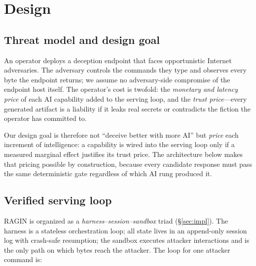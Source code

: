 
\section{Design}
\label{sec:design}

\subsection{Threat model and design goal}
An operator deploys a deception endpoint that faces opportunistic Internet
adversaries. The adversary controls the commands they type and observes every
byte the endpoint returns; we assume no adversary-side compromise of the
endpoint host itself. The operator's cost is twofold: the \emph{monetary and
latency price} of each AI capability added to the serving loop, and the
\emph{trust price}---every generated artifact is a liability if it leaks real
secrets or contradicts the fiction the operator has committed to.

Our design goal is therefore not ``deceive better with more AI'' but
\emph{price} each increment of intelligence: a capability is wired into the
serving loop only if a measured marginal effect justifies its trust price.
The architecture below makes that pricing possible by construction, because
every candidate response must pass the same deterministic gate regardless of
which AI rung produced it.

\subsection{Verified serving loop}
\label{sec:design:loop}
RAGIN is organized as a \emph{harness--session--sandbox} triad
(\S\ref{sec:impl}). The harness is a stateless orchestration loop; all state
lives in an append-only session log with crash-safe resumption; the sandbox
executes attacker interactions and is the only path on which bytes reach the
attacker. The loop for one attacker command is:

